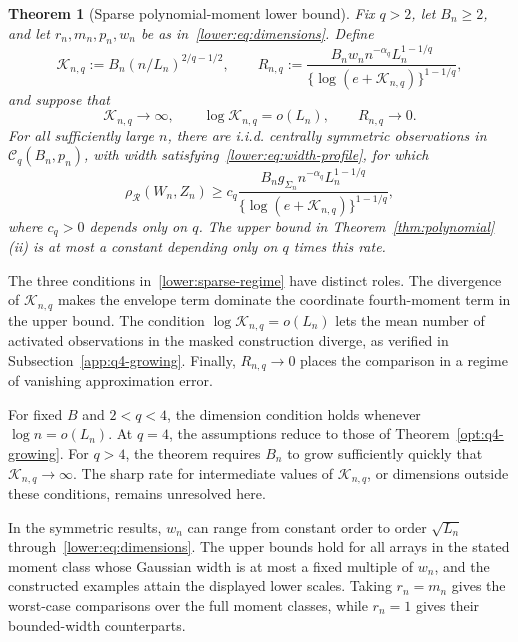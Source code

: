\documentclass[11pt,letterpaper,twoside,leqno]{article}
\theoremstyle{bookplain}
\newtheorem{theorem}{Theorem}
\theoremstyle{bookremark}
\newcommand{\rh}{\rho_{\mathcal R}}
\begin{document}
\begin{theorem}[Sparse polynomial-moment lower bound]\label{lower:sparse}
Fix \(q>2\), let \(B_n\ge2\), and let
\(r_n,m_n,p_n,w_n\) be as in~\eqref{lower:eq:dimensions}.
Define
\[
 \mathcal K_{n,q}:=B_n(n/L_n)^{2/q-1/2},\qquad
 R_{n,q}:=\frac{B_n w_n n^{-\alpha_q}L_n^{1-1/q}}
 {\{\log(e+\mathcal K_{n,q})\}^{1-1/q}},
\]
and suppose that
\begin{equation}
 \mathcal K_{n,q}\to\infty,\qquad
 \log\mathcal K_{n,q}=o(L_n),\qquad R_{n,q}\to0.
 \label{lower:sparse-regime}
\end{equation}
For all sufficiently large \(n\), there are i.i.d. centrally symmetric
observations in \(\mathcal C_q(B_n,p_n)\), with width
satisfying~\eqref{lower:eq:width-profile}, for which
\begin{equation}
 \rh(W_n,Z_n)\ge c_q
 \frac{B_n g_{\Sigma_n}n^{-\alpha_q}L_n^{1-1/q}}
 {\{\log(e+\mathcal K_{n,q})\}^{1-1/q}},
 \label{lower:sparse-rate}
\end{equation}
where \(c_q>0\) depends only on \(q\). The upper bound in
Theorem~\ref{thm:polynomial}\textup{(ii)} is at most a constant
depending only on \(q\) times this rate.
\end{theorem}

The three conditions in~\eqref{lower:sparse-regime} have distinct
roles. The divergence of $\mathcal K_{n,q}$ makes the envelope
term dominate the coordinate fourth-moment term in the upper bound.
The condition $\log\mathcal K_{n,q}=o(L_n)$ lets the mean number
of activated observations in the masked construction diverge, as
verified in Subsection~\ref{app:q4-growing}. Finally, $R_{n,q}\to0$
places the comparison in a regime of vanishing approximation error.

For fixed $B$ and $2<q<4$, the dimension condition holds whenever
$\log n=o(L_n)$. At $q=4$, the assumptions reduce to those of
Theorem~\ref{opt:q4-growing}. For $q>4$, the theorem requires
$B_n$ to grow sufficiently quickly that $\mathcal K_{n,q}\to\infty$.
The sharp rate for intermediate values of $\mathcal K_{n,q}$,
or dimensions outside these conditions, remains unresolved here.

In the symmetric results, $w_n$ can range from constant order to
order $\sqrt{L_n}$ through~\eqref{lower:eq:dimensions}.
The upper bounds hold for all arrays in the stated moment class
whose Gaussian width is at most a fixed multiple of $w_n$, and
the constructed examples attain the displayed lower scales.
Taking $r_n=m_n$ gives the worst-case comparisons over the full
moment classes, while $r_n=1$ gives their bounded-width counterparts.
\end{document}
